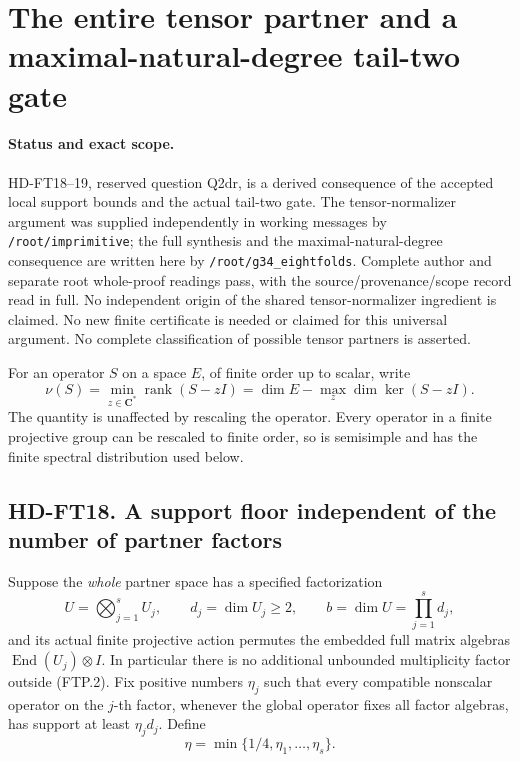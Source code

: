 \section{The entire tensor partner and a maximal-natural-degree tail-two gate}
\label{sec:entire-partner-support}

\paragraph{Status and exact scope.}
HD-FT18--19, reserved question Q2dr, is a derived consequence of the
accepted local support bounds and the actual tail-two gate.  The
tensor-normalizer argument was supplied independently in working
messages by \texttt{/root/imprimitive}; the full synthesis and the
maximal-natural-degree consequence are written here by
\texttt{/root/g34\_eightfolds}.  Complete author and separate root whole-proof readings pass, with the source/provenance/scope record read in full. No independent origin of the shared tensor-normalizer ingredient is claimed.  No new finite
certificate is needed or claimed for this universal argument.
No complete classification of possible
tensor partners is asserted.

For an operator \(S\) on a space \(E\), of finite order up to scalar, write
\[
 \nu(S)=\min_{z\in\mathbf C^*}\operatorname{rank}(S-zI)
       =\dim E-\max_z\dim\ker(S-zI).
 \tag{FTP.1}
\]
The quantity is unaffected by rescaling the operator.  Every operator
in a finite projective group can be rescaled to finite order, so is
semisimple and has the finite spectral distribution used below.

\subsection*{HD-FT18. A support floor independent of the number of partner factors}

Suppose the \emph{whole} partner space has a specified factorization
\[
 U=\bigotimes_{j=1}^s U_j,\qquad d_j=\dim U_j\ge2,
 \qquad b=\dim U=\prod_{j=1}^s d_j,
 \tag{FTP.2}
\]
and its actual finite projective action permutes the embedded full
matrix algebras \(\operatorname{End}(U_j)\otimes I\).
In particular there is no additional unbounded multiplicity factor
outside (FTP.2).  Fix positive numbers \(\eta_j\) such that every
compatible nonscalar operator on the \(j\)-th factor, whenever the
global operator fixes all factor algebras, has support at least
\(\eta_jd_j\).  Define
\[
                 \eta=\min\{1/4,\eta_1,\ldots,\eta_s\}.
 \tag{FTP.3}
\]

